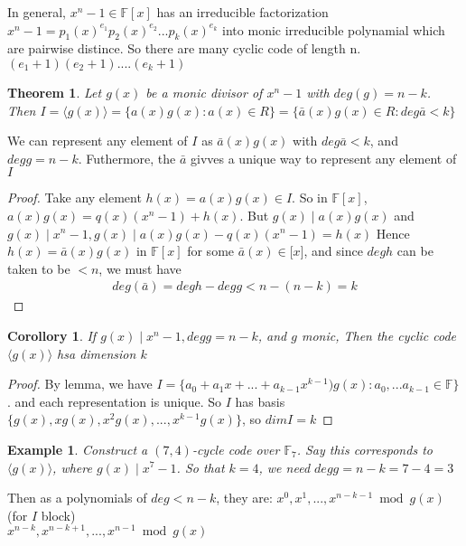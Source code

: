 \documentclass{article}
\newtheorem{thm}{Theorem}
\newtheorem{eg}{Example}
\newtheorem{cor}{Corollory}
\begin{document}
In general, $x^n -1 \in\mathbb{F}[x]$ has an irreducible factorization
$x^n - 1 = p_1(x)^{e_1}p_2(x)^{e_2}...p_k(x)^{e_k}$
into monic irreducible polynamial which are pairwise distince. So there are
many cyclic code of length n.
$(e_1 + 1)(e_2 + 1)....(e_k + 1)$

\begin{thm}
    Let $g(x)$ be a monic divisor of $x^n - 1$ with $deg(g) = n-k$. Then
    $I = \langle g(x) \rangle = \{a(x)g(x): a(x)\in R\}
    = \{\bar{a}(x)g(x) \in R: deg \bar{a} < k\}$
\end{thm}

We can represent any element of $I$ as $\bar{a}(x)g(x)$ with
$deg \bar{a} < k$, and $deg g = n-k$.
Futhermore, the $\bar{a}$ givves a unique way to represent any element
of $I$

\begin{proof}
    Take any element $h(x) = a(x)g(x) \in I$. So in $\mathbb{F}[x]$,
    $a(x)g(x) = q(x)(x^n -1) + h(x)$. But $g(x) \mid a(x)g(x)$ and
    $g(x) \mid x^n -1, g(x) \mid a(x)g(x) - q(x)(x^n -1) = h(x)$
    Hence $h(x) = \bar{a}(x)g(x)$ in $\mathbb{F}[x]$ for some
    $\bar{a}(x)\in\mathbb[x]$, and since $deg h$ can be taken to be
    $< n$, we must have
    \begin{align*}
        deg(\bar{a}) = deg h - deg g < n - (n-k) = k
    \end{align*}
\end{proof}

\begin{cor}
    If $g(x) \mid x^n -1, deg g = n-k$, and $g$ monic, Then the cyclic
    code $\langle g(x) \rangle$ hsa dimension $k$
\end{cor}

\begin{proof}
    By lemma, we have $I = \{a_0 + a_1x + ... + a_{k-1}x^{k-1})g(x): a_0, ...
    a_{k-1}\in\mathbb{F}\}$. and each representation is unique.
    So $I$ has basis $\{g(x), xg(x), x^2g(x), ..., x^{k-1}g(x)\}$, so $dim I = k$
\end{proof}

\begin{eg}
    Construct a $(7,4)$-cycle code over $\mathbb{F}_7$. Say this corresponds to
    $\langle g(x) \rangle$, where $g(x)\mid x^7-1$. So that $k = 4$, we need
    $deg g = n - k = 7-4 =3$
\end{eg}

Then as a polynomials of $deg < n-k$, they are:
$x^0, x^1, ..., x^{n-k-1} \bmod{g(x)}$ (for $I$ block)\\
$x^{n-k}, x^{n-k+1}, ..., x^{n-1} \bmod{g(x)}$
\end{document}
